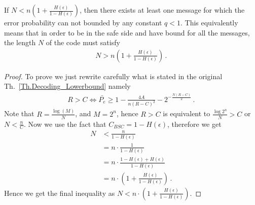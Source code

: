 %
\begin{corollary}
    If $N<n(1+\frac{H(\epsilon)}{1-H(\epsilon)})$, then there exists at least one message for which the error probability can not bounded by any constant $q<1$. This equivalently means that in order to be in the safe side and have bound for all the messages, the length $N$ of the code must satisfy
    \begin{align}
        N > n(1+\frac{H(\epsilon)}{1-H(\epsilon)}) \,.\,
    \end{align}
\end{corollary}
\begin{proof}
    To prove we just rewrite carefully what is stated in the original Th.~\ref{Th.Decoding_Lowerbound} namely
    \begin{align}
        R > C \iff \bar{P_e} \geq 1-\frac{4A}{n(R-C)^2} - 2^{-\frac{N(R-C)}{2}}  \,.\,
    \end{align}
    Note that $R=\frac{\log(M)}{N}$, and $M=2^n$, hence $R>C$ is equivalent to $\frac{\log 2^n}{N} > C$ or $N<\frac{n}{C}$. Now we use the fact that $C_{BSC}=1-H(\epsilon)$, therefore we get
    \begin{align}
        N&<\frac{n}{1-H(\epsilon)}\\
        &=n\cdot\frac{1}{1-H(\epsilon)}
        \\
        &=n\cdot\frac{1-H(\epsilon)+H(\epsilon)}{1-H(\epsilon)} 
        \\
        &= n\cdot(1+\frac{H(\epsilon)}{1-H(\epsilon)}) \,.\,
    \end{align}
    Hence we get the final inequality as $N<n\cdot(1+\frac{H(\epsilon)}{1-H(\epsilon)})$.
\end{proof}
